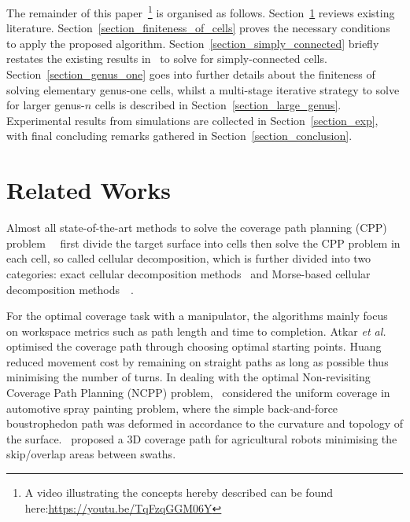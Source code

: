\documentclass[journal]{IEEEtran}
\begin{document}
The remainder of this paper~\footnote{A video illustrating the concepts hereby described can be found 
here:\url{https://youtu.be/TqFzqGGM06Y}} is organised as follows. 
Section~\ref{section_related_works} reviews existing literature. 
Section~\ref{section_finiteness_of_cells} proves the necessary conditions to apply the proposed algorithm. 
Section~\ref{section_simply_connected} briefly restates the existing results in~\cite{Yang2020Cellular} to solve for 
simply-connected cells. Section~\ref{section_genus_one} goes into further details about the finiteness of solving elementary genus-one cells, whilst 
a multi-stage iterative strategy to solve for larger genus-$n$ cells is described in Section~\ref{section_large_genus}. 
Experimental results from simulations are collected in Section~\ref{section_exp}, with final concluding remarks gathered in 
Section~\ref{section_conclusion}.

\section{Related Works}\label{section_related_works}
Almost all state-of-the-art methods to solve the coverage path planning (CPP) problem~\cite{choset2001coverage}~\cite{galceran2013a} 
first divide the target surface into cells then solve the CPP problem in each cell, so called cellular decomposition, which is further divided 
into two categories: exact cellular decomposition methods~\cite{lumelsky1990dynamic} and Morse-based cellular decomposition 
methods~\cite{choset2000exact}~\cite{Acar2002Morse}. 


For the optimal coverage task with a manipulator, the algorithms mainly focus on workspace metrics such as path length and time to completion. 
Atkar \textit{et al.}~\cite{Atkar2003Towards} optimised the coverage path through choosing optimal starting points. 
Huang~\cite{huang2001optimal} reduced movement cost by remaining on straight paths as long as possible thus minimising the number of turns.
In dealing with the optimal Non-revisiting Coverage Path Planning (NCPP) problem,~\cite{Atkar2008Hierarchical} considered 
the uniform coverage in automotive spray painting problem, where the simple back-and-force boustrophedon path was deformed in accordance 
to the curvature and topology of the surface.~\cite{hameed2016side-to-side} proposed a 3D coverage path for agricultural robots 
minimising the skip/overlap areas between swaths. 
\end{document}
